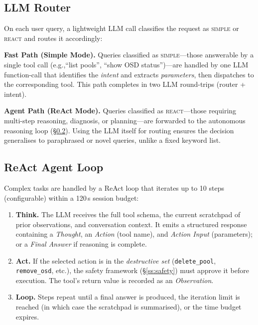 \documentclass[sigplan,nonacm,10pt]{acmart}
\newcommand{\eg}{e.g.,\xspace}
\begin{document}
\subsection{LLM Router}\label{ss:router}

On each user query, a lightweight LLM call classifies the request
as \textsc{simple} or \textsc{react} and routes it accordingly:

\smallskip\noindent
\textbf{Fast Path (Simple Mode).}\enspace
Queries classified as \textsc{simple}---those answerable by a single
tool call (\eg ``list pools'', ``show OSD status'')---are handled
by one LLM function-call that identifies the \emph{intent} and
extracts \emph{parameters}, then dispatches to the corresponding tool.
This path completes in two LLM round-trips (router + intent).

\smallskip\noindent
\textbf{Agent Path (ReAct Mode).}\enspace
Queries classified as \textsc{react}---those requiring multi-step
reasoning, diagnosis, or planning---are forwarded to the autonomous
reasoning loop (\S\ref{ss:react}).
Using the LLM itself for routing ensures the decision generalises
to paraphrased or novel queries, unlike a fixed keyword list.

\subsection{ReAct Agent Loop}\label{ss:react}

Complex tasks are handled by a ReAct loop that iterates up to 10
steps (configurable) within a 120\,s session budget:

\begin{enumerate}
  \item \textbf{Think.}  The LLM receives the full tool schema, the
    current scratchpad of prior observations, and conversation
    context.  It emits a structured response containing a
    \emph{Thought}, an \emph{Action} (tool name), and
    \emph{Action Input} (parameters); or a \emph{Final Answer}
    if reasoning is complete.
  \item \textbf{Act.}  If the selected action is in the
    \emph{destructive set}
    (\texttt{delete\_pool}, \texttt{remove\_osd}, etc.),
    the safety framework (\S\ref{ss:safety}) must approve it before
    execution.  The tool's return value is recorded as an
    \emph{Observation}.
  \item \textbf{Loop.}  Steps repeat until a final answer is
    produced, the iteration limit is reached (in which case the
    scratchpad is summarised), or the time budget expires.
\end{enumerate}
\end{document}

